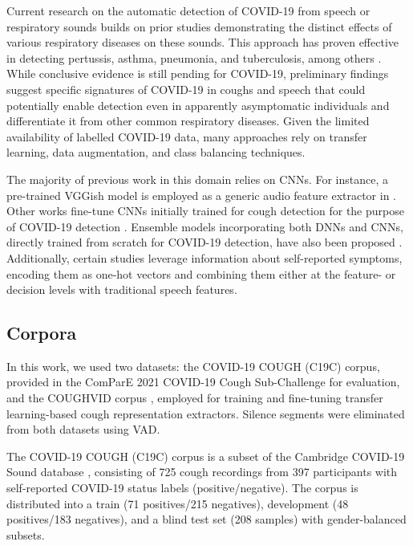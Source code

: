 Current research on the automatic detection of COVID-19 from speech or respiratory sounds builds on prior studies demonstrating the distinct effects of various respiratory diseases on these sounds. This approach has proven effective in detecting pertussis, asthma, pneumonia, and tuberculosis, among others \cite{pramono2016cough}. While conclusive evidence is still pending for COVID-19, preliminary findings suggest specific signatures of COVID-19 in coughs and speech that could potentially enable detection even in apparently asymptomatic individuals and differentiate it from other common respiratory diseases. Given the limited availability of labelled COVID-19 data, many approaches rely on transfer learning, data augmentation, and class balancing techniques.

The majority of previous work in this domain relies on \acp{CNN}. For instance, a pre-trained VGGish model \cite{Hershey2017} is employed as a generic audio feature extractor in \cite{Chloe2020}. Other works fine-tune \acp{CNN} initially trained for cough detection for the purpose of COVID-19 detection \cite{Bagad2020,Imran2020}. Ensemble models incorporating both \acp{DNN} and \acp{CNN}, directly trained from scratch for COVID-19 detection, have also been proposed \cite{Chaudhari2021}. Additionally, certain studies  \cite{Han2021} leverage information about self-reported symptoms, encoding them as one-hot vectors and combining them either at the feature- or decision levels with traditional speech features.

\subsection{Corpora}
In this work, we used two datasets: the COVID-19 COUGH (C19C) corpus, provided in the ComParE 2021 COVID-19 Cough Sub-Challenge \cite{Chloe2020,Han2021} for evaluation, and the COUGHVID corpus \cite{Orlandic2020}, employed for training and fine-tuning transfer learning-based cough representation extractors. Silence segments were eliminated from both datasets using \ac{VAD}.

The COVID-19 COUGH (C19C) corpus is a subset of the Cambridge COVID-19 Sound database \cite{Chloe2020,Han2021}, consisting of 725 cough recordings from 397 participants with self-reported COVID-19 status labels (positive/negative). The corpus is distributed into a train (71 positives/215 negatives), development (48 positives/183 negatives), and a blind test set (208 samples) with gender-balanced subsets. 

